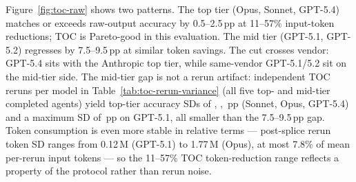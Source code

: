 \documentclass{article}
\begin{document}
Figure~\ref{fig:toc-raw} shows two patterns. The top tier (Opus, Sonnet, GPT-5.4) matches or exceeds raw-output accuracy by 0.5--2.5\,pp at 11--57\% input-token reductions; TOC is Pareto-good in this evaluation. The mid tier (GPT-5.1, GPT-5.2) regresses by 7.5--9.5\,pp at similar token savings. The cut crosses vendor: GPT-5.4 sits with the Anthropic top tier, while same-vendor GPT-5.1/5.2 sit on the mid-tier side. The mid-tier gap is not a rerun artifact: \TOCRerunNumSamples{} independent TOC reruns per model in Table~\ref{tab:toc-rerun-variance} (all five top- and mid-tier completed agents) yield top-tier accuracy SDs of \SonnetTOCRerunSD, \OpusTOCRerunSD, \GPTFiveFourTOCRerunSD\,pp (Sonnet, Opus, GPT-5.4) and a maximum SD of \TOCRerunMaxSD\,pp on GPT-5.1, all smaller than the 7.5--9.5\,pp gap. Token consumption is even more stable in relative terms --- post-splice rerun token SD ranges from 0.12\,M (GPT-5.1) to 1.77\,M (Opus), at most 7.8\% of mean per-rerun input tokens --- so the 11--57\% TOC token-reduction range reflects a property of the protocol rather than rerun noise.
\end{document}
